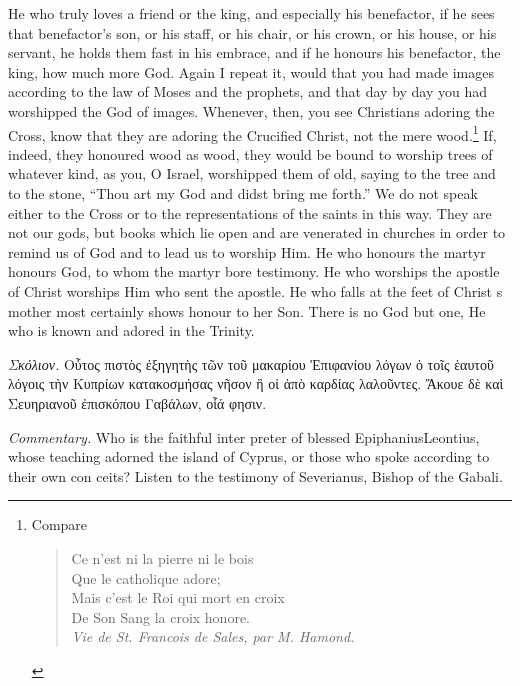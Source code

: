 \documentclass[10pt]{book}
\newcommand{\switchGreek}[1][]{\selectlanguage{polutonikogreek} \switchcolumn*[#1]}
\newcommand{\switchEnglish}{\selectlanguage{english} \switchcolumn}
\begin{document}
\begin{paracol}{2}
He who truly loves a friend or the king, 
and especially his benefactor, if he sees that 
benefactor's son, or his staff, or his chair, or 
his crown, or his house, or his servant, he 
holds them fast in his embrace, and if he 
honours his benefactor, the king, how much 
more God. Again I repeat it, would that 
you had made images according to the law 
of Moses and the prophets, and that day by 
day you had worshipped the God of images. 
Whenever, then, you see Christians adoring 
the Cross, know that they are adoring the 
Crucified Christ, not the mere wood.\footnote{Compare\textemdash
\begin{verse}
Ce n'est ni la pierre ni le bois \\
\hspace{2em} Que le catholique adore; \\
Mais c'est le Roi qui mort en croix \\
\hspace{2em} De Son Sang la croix honore. \\
\textemdash\emph{Vie de St. Francois de Sales, par M. Hamond.} 
\end{verse}
}
If, indeed, they honoured wood as wood, they 
would be bound to worship trees of whatever 
kind, as you, O Israel, worshipped them of 
old, saying to the tree and to the stone, 
``Thou art my God and didst bring me forth.''
We do not speak either to the Cross or to 
the representations of the saints in this way. 
They are not our gods, but books which lie 
open and are venerated in churches in order 
to remind us of God and to lead us to 
worship Him. He who honours the martyr 
honours God, to whom the martyr bore 
testimony. He who worships the apostle 
of Christ worships Him who sent the apostle. 
He who falls at the feet of Christ s mother 
most certainly shows honour to her Son. 
There is no God but one, He who is known 
and adored in the Trinity. 

\switchGreek

\emph{Σκόλιον.} Οὗτος πιστὸς ἐξηγητὴς τῶν τοῦ μακαρίου Ἐπιφανίου λόγων ὁ τοῖς
ἑαυτοῦ λόγοις τὴν Κυπρίων κατακοσμήσας νῆσον ἢ οἱ ἀπὸ καρδίας λαλοῦντες.
Ἄκουε δὲ καὶ Σευηριανοῦ ἐπισκόπου Γαβάλων, οἷά φησιν.

\switchEnglish

\emph{Commentary.} Who is the faithful inter 
preter of blessed Epiphanius\textemdash Leontius, whose 
teaching adorned the island of Cyprus, or 
those who spoke according to their own con 
ceits? Listen to the testimony of Severianus, 
Bishop of the Gabali. 


\end{paracol}
\end{document}
